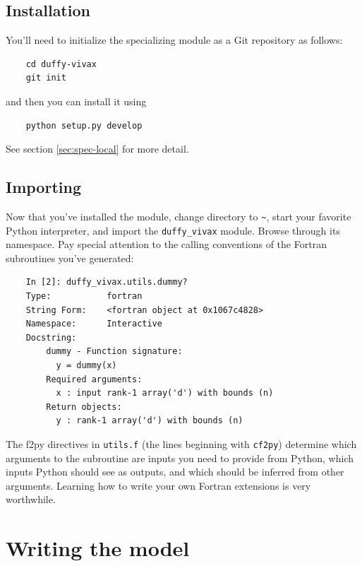 \subsection{Installation}
You'll need to initialize the specializing module as a Git repository as follows:
\begin{verbatim}
    cd duffy-vivax
    git init
\end{verbatim}
and then you can install it using
\begin{verbatim}
    python setup.py develop
\end{verbatim}
See section \ref{sec:spec-local} for more detail.

\subsection{Importing}
Now that you've installed the module, change directory to \texttt{\~}, start your favorite Python interpreter, and import the \texttt{duffy\_vivax} module. Browse through its namespace. Pay special attention to the calling conventions of the Fortran subroutines you've generated:
\begin{verbatim}
    In [2]: duffy_vivax.utils.dummy?
    Type:           fortran
    String Form:    <fortran object at 0x1067c4828>
    Namespace:      Interactive
    Docstring:
        dummy - Function signature:
          y = dummy(x)
        Required arguments:
          x : input rank-1 array('d') with bounds (n)
        Return objects:
          y : rank-1 array('d') with bounds (n)
\end{verbatim}
The f2py directives in \texttt{utils.f} (the lines beginning with \texttt{cf2py}) determine which arguments to the subroutine are inputs you need to provide from Python, which inputs Python should see as outputs, and which should be inferred from other arguments. Learning how to write your own Fortran extensions is very worthwhile.

\section{Writing the model}

